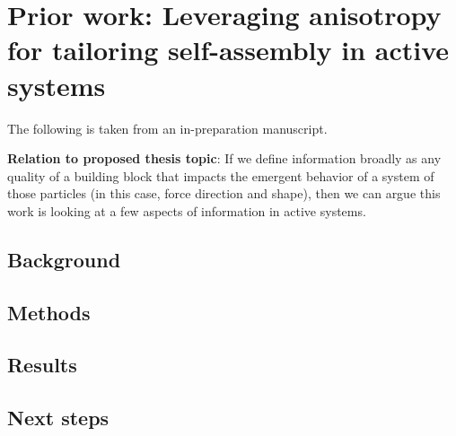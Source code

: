 \section{Prior work: Leveraging anisotropy for tailoring self-assembly in active systems}

The following is taken from an in-preparation manuscript. \cite{Moran_2018_unpublished}

\textbf{Relation to proposed thesis topic}: If we define information broadly as any quality of a building block that impacts the emergent behavior of a system of those particles (in this case, force direction and shape), then we can argue this work is looking at a few aspects of information in active systems.


\subsection{Background}

\subsection{Methods}

\subsection{Results}

\subsection{Next steps}


